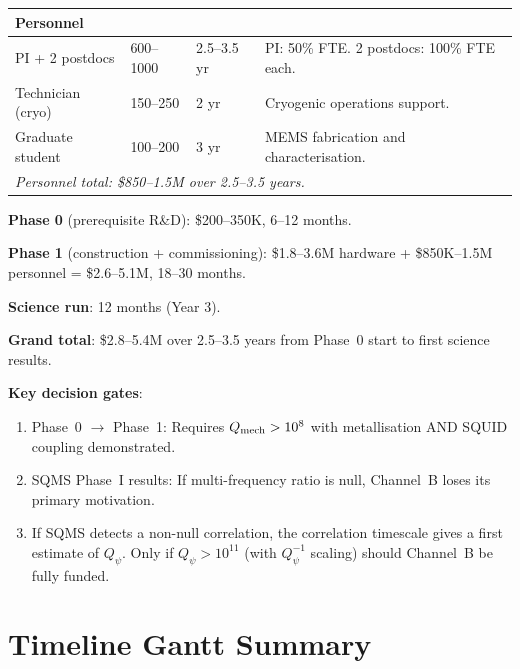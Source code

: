 \documentclass[11pt]{article}
\newcommand{\Qpsi}{Q_\psi}
\newcommand{\Qmech}{Q_{\rm mech}}
\theoremstyle{definition}
\theoremstyle{remark}
\begin{document}
\begin{table}[H]
\begin{tabular}{@{}p{4cm}p{2cm}p{2cm}p{4cm}@{}}
\midrule
\multicolumn{4}{l}{\textbf{Personnel}} \\
\midrule
PI + 2 postdocs &
  600--1000 & 2.5--3.5 yr &
  PI: 50\% FTE. 2 postdocs: 100\% FTE each. \\
Technician (cryo) &
  150--250 & 2 yr &
  Cryogenic operations support. \\
Graduate student &
  100--200 & 3 yr &
  MEMS fabrication and characterisation. \\
\midrule
\multicolumn{4}{l}{\textit{Personnel total: \$850--1.5M over 2.5--3.5 years.}} \\
\bottomrule
\end{tabular}
\end{table}

\begin{tcolorbox}[colback=blue!3!white, colframe=blue!50!black,
  title=\textbf{TOTAL CHANNEL~B COST AND TIMELINE}]

\textbf{Phase 0} (prerequisite R\&D): \$200--350K, 6--12 months.

\textbf{Phase 1} (construction + commissioning): \$1.8--3.6M hardware
+ \$850K--1.5M personnel = \$2.6--5.1M, 18--30 months.

\textbf{Science run}: 12 months (Year 3).

\textbf{Grand total}: \$2.8--5.4M over 2.5--3.5 years from Phase~0
start to first science results.

\textbf{Key decision gates}:
\begin{enumerate}[nosep]
\item Phase~0 $\to$ Phase~1: Requires $\Qmech > 10^8$ with
  metallisation AND SQUID coupling demonstrated.
\item SQMS Phase~I results: If multi-frequency ratio is null,
  Channel~B loses its primary motivation.
\item If SQMS detects a non-null correlation, the correlation
  timescale gives a first estimate of $\Qpsi$. Only if
  $\Qpsi > 10^{11}$ (with $\Qpsi^{-1}$ scaling) should Channel~B
  be fully funded.
\end{enumerate}
\end{tcolorbox}


\section{Timeline Gantt Summary}
\label{sec:gantt}
\end{document}
